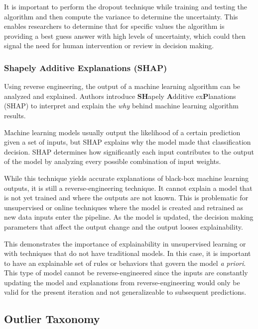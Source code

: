 It is important to perform the dropout technique while training and testing the algorithm and then compute the variance to determine the uncertainty. This enables researchers to determine that for specific values the algorithm is providing a best guess answer with high levels of uncertainty, which could then signal the need for human intervention or review in decision making.

\subsubsection{Shapely Additive Explanations (SHAP)}

Using reverse engineering, the output of a machine learning algorithm can be analyzed and explained. Authors \cite{SHAP-og-paper} introduce \textbf{SH}apely \textbf{A}dditive ex\textbf{P}lanations (SHAP) to interpret and explain the \textit{why} behind machine learning algorithm results.

Machine learning models usually output the likelihood of a certain prediction given a set of inputs, but SHAP explains why the model made that classification decision. SHAP determines how significantly each input contributes to the output of the model by analyzing every possible combination of input weights.

While this technique yields accurate explanations of black-box machine learning outputs, it is still a reverse-engineering technique. It cannot explain a model that is not yet trained and where the outputs are not known. This is problematic for unsupervised or online techniques where the model is created and retrained as new data inputs enter the pipeline. As the model is updated, the decision making parameters that affect the output change and the output looses explainability.

This demonstrates the importance of explainability in unsupervised learning or with techniques that do not have traditional models. In this case, it is important to have an explainable set of rules or behaviors that govern the model \textit{a priori}. This type of model cannot be reverse-engineered since the inputs are constantly updating the model and explanations from reverse-engineering would only be valid for the present iteration and not generalizeable to subsequent predictions.

\subsection{Outlier Taxonomy}

